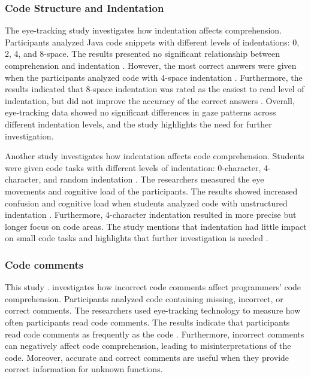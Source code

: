 \subsubsection{Code Structure and Indentation} 


The eye-tracking study \citet{bauer2017indentations} investigates how indentation affects comprehension. Participants analyzed Java code snippets with different levels of indentations: 0, 2, 4, and 8-space. The results presented no significant relationship between comprehension and indentation \citet{bauer2017indentations}. However, the most correct answers were given when the participants analyzed code with 4-space indentation . Furthermore, the results indicated that 8-space indentation was rated as the easiest to read level of indentation, but did not improve the accuracy of the correct answers \citet{bauer2017indentations}. Overall, eye-tracking data showed no significant differences in gaze patterns across different indentation levels, and the study highlights the need for further investigation. 



Another study \citet{yorimoto2024quantitative} investigates how indentation affects code comprehension. Students were given code tasks with different levels of indentation: 0-character, 4-character, and random indentation \citet{yorimoto2024quantitative}. The researchers measured the eye movements and cognitive load of the participants. The results showed increased confusion and cognitive load when students analyzed code with unstructured indentation \citet{yorimoto2024quantitative}. Furthermore, 4-character indentation resulted in more precise but longer focus on code areas. The study mentions that indentation had little impact on small code tasks and highlights that further investigation is needed \citet{yorimoto2024quantitative}.   
\subsubsection{Code comments} 

This study \citet{bakhuizen2019comments}. investigates how incorrect code comments affect programmers' code comprehension. Participants analyzed code containing missing, incorrect, or correct comments.
The researchers used eye-tracking technology to measure how often participants read code comments. The results indicate that participants read code comments as frequently as the code \citet{bakhuizen2019comments}. Furthermore, incorrect comments can negatively affect code comprehension, leading to misinterpretations of the code. Moreover, accurate and correct comments are useful when they provide correct information for unknown functions. 

